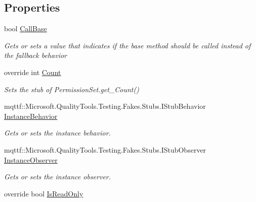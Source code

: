\subsection*{Properties}
\begin{DoxyCompactItemize}
\item 
bool \hyperlink{class_system_1_1_security_1_1_fakes_1_1_stub_permission_set_a9883d7fe11762e093ec314156d4ba540}{Call\-Base}
\begin{DoxyCompactList}\small\item\em Gets or sets a value that indicates if the base method should be called instead of the fallback behavior\end{DoxyCompactList}\item 
override int \hyperlink{class_system_1_1_security_1_1_fakes_1_1_stub_permission_set_a914e1ce606982d00dd59cc1c72d75be3}{Count}
\begin{DoxyCompactList}\small\item\em Sets the stub of Permission\-Set.\-get\-\_\-\-Count()\end{DoxyCompactList}\item 
mqttf\-::\-Microsoft.\-Quality\-Tools.\-Testing.\-Fakes.\-Stubs.\-I\-Stub\-Behavior \hyperlink{class_system_1_1_security_1_1_fakes_1_1_stub_permission_set_a102a16a1e9ff98056ac907f240643241}{Instance\-Behavior}
\begin{DoxyCompactList}\small\item\em Gets or sets the instance behavior.\end{DoxyCompactList}\item 
mqttf\-::\-Microsoft.\-Quality\-Tools.\-Testing.\-Fakes.\-Stubs.\-I\-Stub\-Observer \hyperlink{class_system_1_1_security_1_1_fakes_1_1_stub_permission_set_a9a7e7122a8779c4157d4616648b33048}{Instance\-Observer}
\begin{DoxyCompactList}\small\item\em Gets or sets the instance observer.\end{DoxyCompactList}\item 
override bool \hyperlink{class_system_1_1_security_1_1_fakes_1_1_stub_permission_set_aa50c34f8d4ca0a4e389f0f38182d73d6}{Is\-Read\-Only}

\end{DoxyCompactItemize}
